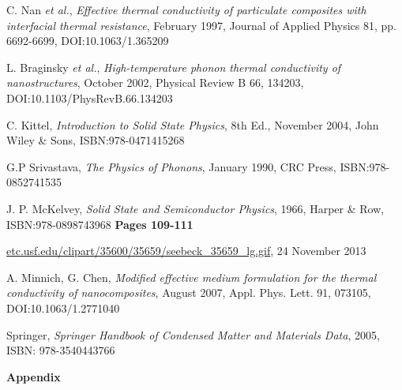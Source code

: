 \documentclass[12pt]{article}
\begin{document}
\begin{thebibliography}{11}
C. Nan \emph{et al.},
\emph{Effective thermal conductivity of particulate composites with interfacial thermal resistance},
February 1997,
Journal of Applied Physics 81, pp. 6692-6699,
DOI:10.1063/1.365209

L. Braginsky \emph{et al.},
\emph{High-temperature phonon thermal conductivity of nanostructures},
October 2002,
Physical Review B 66, 134203,
DOI:10.1103/PhysRevB.66.134203

C. Kittel,
\emph{Introduction to Solid State Physics}, 8th Ed.,
November 2004,
John Wiley \& Sons,
ISBN:978-0471415268

G.P Srivastava,
\emph{The Physics of Phonons},
January 1990,
CRC Press,
ISBN:978-0852741535

J. P. McKelvey,
\emph{Solid State and Semiconductor Physics},
1966,
Harper \& Row,
ISBN:978-0898743968
\textbf{Pages 109-111}

\url{etc.usf.edu/clipart/35600/35659/seebeck_35659_lg.gif},
24 November 2013

A. Minnich, G. Chen,
\emph{Modified effective medium formulation for the thermal conductivity of nanocomposites},
August 2007,
Appl. Phys. Lett. 91, 073105,
DOI:10.1063/1.2771040

Springer,
\emph{Springer Handbook of Condensed Matter and Materials Data},
2005,
ISBN: 978-3540443766

\end{thebibliography}

\pagebreak

\appendix

\begin{center}
{\Huge\textbf{Appendix}}
\end{center}



\end{document}
